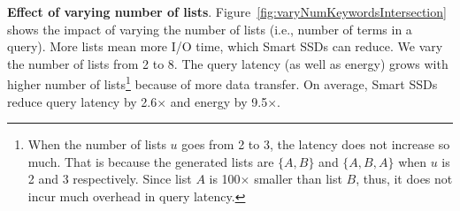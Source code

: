 






\textbf{Effect of varying number of lists}.
Figure~\ref{fig:varyNumKeywordsIntersection} shows the impact of varying the number of lists (i.e., number of terms in a query). More lists mean more I/O time, which Smart SSDs can reduce.
We vary the number of lists from 2 to 8.
The query latency (as well as energy) grows with higher number of lists\footnote{\small When the number of lists $u$ goes from 2 to 3, the latency does not increase so much. That is because the generated lists are $\{A, B\}$ and $\{A, B, A\}$ when $u$ is 2 and 3 respectively. Since list $A$ is 100$\times$ smaller than list $B$, thus, it does not incur much overhead in query latency.} because of more data transfer.
On average, Smart SSDs reduce query latency by 2.6$\times$ and energy by 9.5$\times$.

